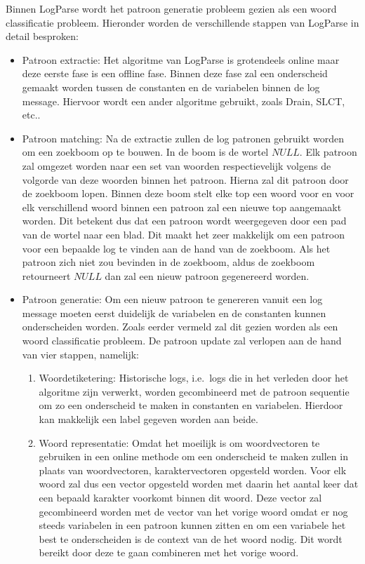 Binnen LogParse wordt het patroon generatie probleem gezien als een woord classificatie probleem. Hieronder worden de verschillende stappen van LogParse in detail besproken:
\begin{itemize}
    \item Patroon extractie: Het algoritme van LogParse is grotendeels online maar deze eerste fase is een offline fase. Binnen deze fase zal een onderscheid gemaakt worden tussen de constanten en de variabelen binnen de log message. Hiervoor wordt een ander algoritme gebruikt, zoals Drain, SLCT, etc..\\
     
    \item Patroon matching: Na de extractie zullen de log patronen gebruikt worden om een zoekboom op te bouwen. In de boom is de wortel $NULL$. Elk patroon zal omgezet worden naar een set van woorden respectievelijk volgens de volgorde van deze woorden binnen het patroon. Hierna zal dit patroon door de zoekboom lopen. Binnen deze boom stelt elke top een woord voor en voor elk verschillend woord binnen een patroon zal een nieuwe top aangemaakt worden. Dit betekent dus dat een patroon wordt weergegeven door een pad van de wortel naar een blad. Dit maakt het zeer makkelijk om een patroon voor een bepaalde log te vinden aan de hand van de zoekboom. Als het patroon zich niet zou bevinden in de zoekboom, aldus de zoekboom retourneert $NULL$ dan zal een nieuw patroon gegenereerd worden.\\
    
    \item Patroon generatie: Om een nieuw patroon te genereren vanuit een log message moeten eerst duidelijk de variabelen en de constanten kunnen onderscheiden worden. Zoals eerder vermeld zal dit gezien worden als een woord classificatie probleem. De patroon update zal verlopen aan de hand van vier stappen, namelijk:
    \begin{enumerate}
        \item Woordetiketering: Historische logs, i.e.\ logs die in het verleden door het algoritme zijn verwerkt, worden gecombineerd met de patroon sequentie om zo een onderscheid te maken in constanten en variabelen. Hierdoor kan makkelijk een label gegeven worden aan beide.\\
        
        \item Woord representatie: Omdat het moeilijk is om woordvectoren te gebruiken in een online methode om een onderscheid te maken zullen in plaats van woordvectoren, karaktervectoren opgesteld worden. Voor elk woord zal dus een vector opgesteld worden met daarin het aantal keer dat een bepaald karakter voorkomt binnen dit woord. Deze vector zal gecombineerd worden met de vector van het vorige woord omdat er nog steeds variabelen in een patroon kunnen zitten en om een variabele het best te onderscheiden is de context van de het woord nodig. Dit wordt bereikt door deze te gaan combineren met het vorige woord.\\
        

\end{enumerate}
\end{itemize}
